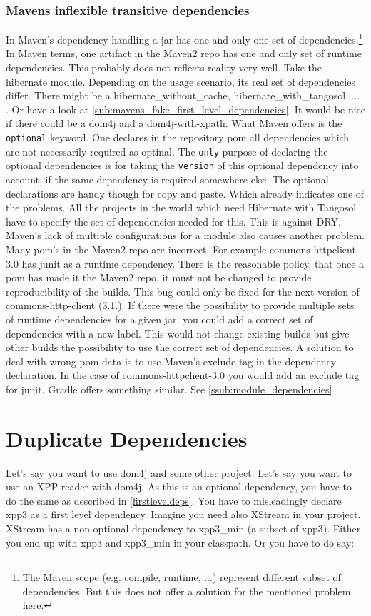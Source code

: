 \subsubsection{Mavens inflexible transitive dependencies}
In Maven’s dependency handling a jar has one and only one set of dependencies.\footnote{The Maven scope (e.g. compile, runtime, ...) represent different subset of dependencies. But this does not offer a solution for the mentioned problem here.} In Maven terms, one artifact in the Maven2 repo has one and only set of runtime dependencies. This probably does not reflects reality very well. Take the hibernate module. Depending on the usage scenario, its real set of dependencies differ. There might be a hibernate\_without\_cache, hibernate\_with\_tangosol, ... . Or have a look at \ref{sub:mavens_fake_first_level_dependencies}. It would be nice if there could be a dom4j and a dom4j-with-xpath. What Maven offers is the \texttt{optional} keyword. One declares in the repository pom all dependencies which are not necessarily required as optinal. The \texttt{only} purpose of declaring the optional dependencies is for taking the \texttt{version} of this optional dependency into account, if the same dependency is required somewhere else. The optional declarations are handy though for copy and paste. Which already indicates one of the problems. All the projects in the world which need Hibernate with Tangosol have to specify the set of dependencies needed for this. This is against DRY. 
Maven's lack of multiple configurations for a module also causes another problem. Many pom's in the Maven2 repo are incorrect. For example commons-httpclient-3.0 has junit as a runtime dependency. There is the reasonable policy, that once a pom has made it the Maven2 repo, it must not be changed to provide reproducibility of the builds. This bug could only be fixed for the next version of commons-http-client (3.1.). If there were the possibility to provide multiple sets of runtime dependencies for a given jar, you could add a correct set of dependencies with a new label. This would not change existing builds but give other builds the possibility to use the correct set of dependencies. A solution to deal with wrong pom data is to use Maven's exclude tag in the dependency declaration. In the case of commons-httpclient-3.0 you would add an exclude tag for junit. Gradle offers something similar. See \ref{ssub:module_dependencies}

\section{Duplicate Dependencies} %
\label{sec:duplicate_dependencies}
Let's say you want to use dom4j and some other project. Let's say you want to use an XPP reader with dom4j. As this is an optional dependency, you have to do the same as described in \ref{firstleveldeps}. You have to misleadingly declare xpp3 as a first level dependency. Imagine you need also XStream in your project. XStream has a non optional dependency to xpp3\_min (a subset of xpp3). Either you end up with xpp3 and xpp3\_min in your classpath. Or you have to do say:

